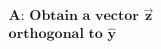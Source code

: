 \documentclass[preview]{standalone}
\begin{document}
\begin{align*}
\textbf{A: Obtain a vector} \,\, \mathbf{\vec{z}} \\ \textbf{orthogonal to} \,\, \mathbf{\hat{y}}
\end{align*}
\end{document}
